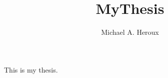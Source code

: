 \documentclass[10pt,letterpaper,titlepage]{book}
\author{Michael A. Heroux}
\title{MyThesis}
\begin{document}
	This is my thesis.
\end{document}
